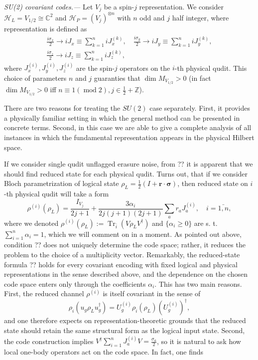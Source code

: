 \documentclass[twocolumn,superscriptaddress,aps,showpacs,amsmath,amstex,amssymb,citeautoscript,floatfix,pra,preprintnumbers]{revtex4-2}
\theoremstyle{plain}
\theoremstyle{plain}
\theoremstyle{plain}
\theoremstyle{plain}
\theoremstyle{plain}
\theoremstyle{plain}
\begin{document}
\textit{SU(2) covariant codes.---} 
Let $V_j$ be a spin-$j$ representation. We consider $\mathcal{H}_L=V_{1/2}\cong\mathbb{C}^2$ and $\mathcal{H}_P=(V_{j})^{\otimes n}$ with $n$ odd and $j$ half integer, where representation is defined
as
\[
\begin{gathered}
\frac{i \sigma_x}{2} \rightarrow i J_x \equiv \sum_{k=1}^n i J_x^{(k)}, \quad \frac{i \sigma_y}{2} \rightarrow i J_y \equiv \sum_{k=1}^n i J_y^{(k)}, \\\frac{i \sigma_z}{2} \rightarrow i J_z \equiv \sum_{k=1}^n i J_z^{(k)},
\end{gathered}
\]
where $J_x^{(i)}, J_y^{(i)}, J_z^{(i)}$ are the spin-$j$ operators on the $i$-th physical qudit. This choice of parameters $n$ and $j$ guaranties that $\operatorname{dim}M_{V_{1/2}}>0$ (in fact $\operatorname{dim}M_{V_{1/2}}>0$ iff $n\equiv 1 (\operatorname{mod} 2), j\in \frac{1}{2}+\mathbb{Z}$).

There are two reasons for treating the $SU(2)$ case separately. First, it provides a physically familiar setting in which the general method can be presented in concrete terms. Second, in this case we are able to give a complete analysis of all instances in which the fundamental representation appears in the physical Hilbert space.

If we consider single qudit unflagged erasure noise, from ?? it is apparent that we should find reduced state for each physical qudit.
Turns out, that if we consider Bloch parametrization of logical state $\rho_L=\frac{1}{2}(I+\mathbf{r} \cdot \boldsymbol{\sigma})$, then reduced state on $i$-th physical qudit will take a form
\[
    \rho^{(i)}\left(\rho_L\right)=\frac{I_{V_j}}{2 j+1}+\frac{3\alpha_i}{2 j(j+1)(2 j+1)} \sum_a r_a J_a^{(i)}, \quad i=\bar{1, n},
\]
where we denoted $\rho^{(i)}\left(\rho_L\right):=\operatorname{Tr}_{\bar{i}}(V\rho_L V^{\dagger})$ and $\{\alpha_i\geq0\}$ are s. t. $\sum_{i=1}^n\alpha_i=1$, which we will comment on in a moment. As pointed out above, condition ?? does not uniquely determine the code space; rather, it reduces the problem to the choice of a multiplicity vector. Remarkably, the reduced-state formula ?? holds for every covariant encoding with fixed logical and physical representations in the sense described above, and the dependence on the chosen code space enters only through the coefficients $\alpha_i$. This has two main reasons. First, the reduced channel $\rho^{(i)}$ is itself covariant in the sense of
\[
    \rho_i\left(u_g \rho_L u_g^{\dagger}\right)=U_g^{(i)} \rho_i\left(\rho_L\right)\left(U_g^{(i)}\right)^{\dagger},
\]
and one therefore expects on representation-theoretic grounds that the reduced state should retain the same structural form as the logical input state. Second, the code construction implies $V^{\dagger} \sum_{i=1}^nJ_a^{(i)} V=\frac{\sigma_a}{2}$, so it is natural to ask how local one-body operators act on the code space. In fact, one finds
\end{document}
